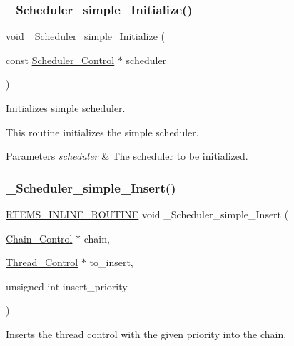 \subsubsection{\texorpdfstring{\_Scheduler\_simple\_Initialize()}{\_Scheduler\_simple\_Initialize()}}
{\footnotesize\ttfamily void \+\_\+\+Scheduler\+\_\+simple\+\_\+\+Initialize (\begin{DoxyParamCaption}\item[{const \mbox{\hyperlink{struct__Scheduler__Control}{Scheduler\+\_\+\+Control}} $\ast$}]{scheduler }\end{DoxyParamCaption})}



Initializes simple scheduler. 

This routine initializes the simple scheduler.


\begin{DoxyParams}{Parameters}
{\em scheduler} & The scheduler to be initialized. \\
\hline
\end{DoxyParams}
\mbox{\label{group__RTEMSScoreSchedulerSimple_gaa5300b25adb782773a0974c4a4419fb2}} 
\subsubsection{\texorpdfstring{\_Scheduler\_simple\_Insert()}{\_Scheduler\_simple\_Insert()}}
{\footnotesize\ttfamily \mbox{\hyperlink{group__RTEMSScoreBaseDefs_gac216239df231d5dbd15e3520b0b9313f}{R\+T\+E\+M\+S\+\_\+\+I\+N\+L\+I\+N\+E\+\_\+\+R\+O\+U\+T\+I\+NE}} void \+\_\+\+Scheduler\+\_\+simple\+\_\+\+Insert (\begin{DoxyParamCaption}\item[{\mbox{\hyperlink{unionChain__Control}{Chain\+\_\+\+Control}} $\ast$}]{chain,  }\item[{\mbox{\hyperlink{struct__Thread__Control}{Thread\+\_\+\+Control}} $\ast$}]{to\+\_\+insert,  }\item[{unsigned int}]{insert\+\_\+priority }\end{DoxyParamCaption})}



Inserts the thread control with the given priority into the chain. 


